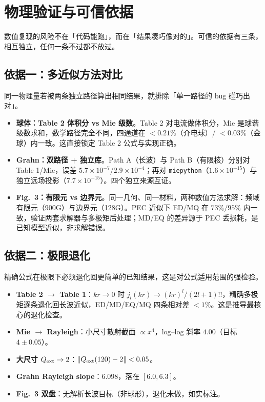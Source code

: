 \section{物理验证与可信依据}

数值复现的风险不在「代码能跑」，而在「结果凑巧像对的」。可信的依据有三条，相互独立，任何一条不过都不放过。

\subsection{依据一：多近似方法对比}

同一物理量若被两条独立路径算出相同结果，就排除「单一路径的 bug 碰巧出对」。

\begin{itemize}
  \item \textbf{球体：Table 2 体积分 vs Mie 级数}。Table 2 对电流做体积分，Mie 是球谐级数求和，数学路径完全不同，四通道在 $<0.21\%$（介电球）/ $<0.03\%$（金球）内一致。这直接锁定 Table 2 公式与实现正确。
  \item \textbf{Grahn：双路径 + 独立库}。Path A（长波）与 Path B（有限核）分别对 Table 1/Mie，误差 $5.7\times10^{-7}$/$2.9\times10^{-4}$；再对 \texttt{miepython}（$1.6\times10^{-15}$）与独立远场投影（$7.7\times10^{-15}$）。四个独立来源互证。
  \item \textbf{Fig.~3：有限元 vs 边界元}。同一几何、同一材料，两种数值方法求解：频域有限元（900G）与边界元（128G）。PEC 近似下 ED/MQ 在 $73\%/95\%$ 内一致，验证两套求解器与多极矩后处理；MD/EQ 的差异源于 PEC 丢损耗，是已知模型近似，非求解错误。
\end{itemize}

\subsection{依据二：极限退化}

精确公式在极限下必须退化回更简单的已知结果，这是对公式适用范围的强检验。

\begin{itemize}
  \item \textbf{Table 2 $\to$ Table 1}：$kr\to0$ 时 $j_l(kr)\to(kr)^l/(2l+1)!!$，精确多极矩逐条退化回长波近似，ED/MD/EQ/MQ 四条相对差 $<1\%$。这是推导最核心的退化检查。
  \item \textbf{Mie $\to$ Rayleigh}：小尺寸散射截面 $\propto x^4$，log--log 斜率 $4.00$（目标 $4\pm0.05$）。
  \item \textbf{大尺寸 $Q_{\rm ext}\to2$}：$\|Q_{\rm ext}(120)-2\|<0.05$。
  \item \textbf{Grahn Rayleigh slope}：$6.098$，落在 $[6.0,6.3]$。
  \item \textbf{Fig.~3 双盘}：无解析长波目标（非球形），退化未做，如实标注。
\end{itemize}

